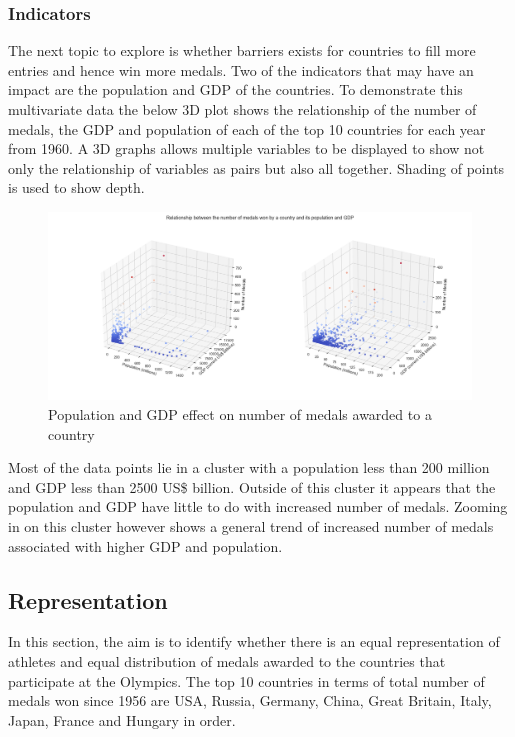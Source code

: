 \documentclass[a4 paper, 12pt]{article}
\begin{document}
        \subsubsection{Indicators}
        The next topic to explore is whether barriers exists for countries to fill more entries and hence win more medals. Two of the indicators that may have an impact are the population and GDP of the countries. To demonstrate this multivariate data the below 3D plot shows the relationship of the number of medals, the GDP and population of each of the top 10 countries for each year from 1960. A 3D graphs allows multiple variables to be displayed to show not only the relationship of variables as pairs but also all together. Shading of points is used to show depth.
        \begin{figure} [H]
            \centering
            \includegraphics[width=\textwidth, frame]
                {./images/graph/countries_pop_gdp_3d.png}      
                \caption{Population and GDP effect on number of medals awarded to a country} 
        \end{figure}

        Most of the data points lie in a cluster with a population less than 200 million and GDP less than 2500 US\$ billion. Outside of this cluster it appears that the population and GDP have little to do with increased number of medals. Zooming in on this cluster however shows a general trend of increased number of medals associated with higher GDP and population.
          



    \subsection{Representation}
    In this section, the aim is to identify whether there is an equal representation of athletes and equal distribution of medals awarded to the countries that participate at the Olympics. The top 10 countries in terms of total number of medals won since 1956 are USA, Russia, Germany, China, Great Britain, Italy, Japan, France and Hungary in order.
\end{document}
